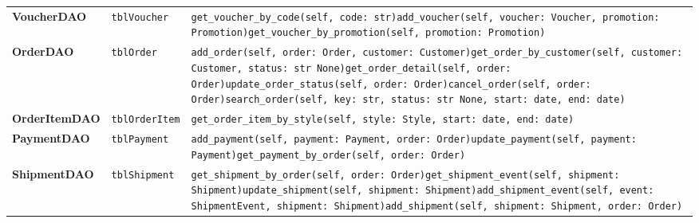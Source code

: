 {\begin{xltabular}{\textwidth}{@{}L{3.5cm} L{3.4cm} Y@{}}
\textbf{VoucherDAO} & \texttt{tblVoucher} & \texttt{get\_\allowbreak{}voucher\_\allowbreak{}by\_\allowbreak{}code(self,\allowbreak{} code: str)}\newline \texttt{add\_\allowbreak{}voucher(self,\allowbreak{} voucher: Voucher,\allowbreak{} promotion: Promotion)}\newline \texttt{get\_\allowbreak{}voucher\_\allowbreak{}by\_\allowbreak{}promotion(self,\allowbreak{} promotion: Promotion)} \\
\textbf{OrderDAO} & \texttt{tblOrder} & \texttt{add\_\allowbreak{}order(self,\allowbreak{} order: Order,\allowbreak{} customer: Customer)}\newline \texttt{get\_\allowbreak{}order\_\allowbreak{}by\_\allowbreak{}customer(self,\allowbreak{} customer: Customer,\allowbreak{} status: str \textbar{} None)}\newline \texttt{get\_\allowbreak{}order\_\allowbreak{}detail(self,\allowbreak{} order: Order)}\newline \texttt{update\_\allowbreak{}order\_\allowbreak{}status(self,\allowbreak{} order: Order)}\newline \texttt{cancel\_\allowbreak{}order(self,\allowbreak{} order: Order)}\newline \texttt{search\_\allowbreak{}order(self,\allowbreak{} key: str,\allowbreak{} status: str \textbar{} None,\allowbreak{} start: date,\allowbreak{} end: date)} \\
\textbf{OrderItemDAO} & \texttt{tblOrderItem} & \texttt{get\_\allowbreak{}order\_\allowbreak{}item\_\allowbreak{}by\_\allowbreak{}style(self,\allowbreak{} style: Style,\allowbreak{} start: date,\allowbreak{} end: date)} \\
\textbf{PaymentDAO} & \texttt{tblPayment} & \texttt{add\_\allowbreak{}payment(self,\allowbreak{} payment: Payment,\allowbreak{} order: Order)}\newline \texttt{update\_\allowbreak{}payment(self,\allowbreak{} payment: Payment)}\newline \texttt{get\_\allowbreak{}payment\_\allowbreak{}by\_\allowbreak{}order(self,\allowbreak{} order: Order)} \\
\textbf{ShipmentDAO} & \texttt{tblShipment} & \texttt{get\_\allowbreak{}shipment\_\allowbreak{}by\_\allowbreak{}order(self,\allowbreak{} order: Order)}\newline \texttt{get\_\allowbreak{}shipment\_\allowbreak{}event(self,\allowbreak{} shipment: Shipment)}\newline \texttt{update\_\allowbreak{}shipment(self,\allowbreak{} shipment: Shipment)}\newline \texttt{add\_\allowbreak{}shipment\_\allowbreak{}event(self,\allowbreak{} event: ShipmentEvent,\allowbreak{} shipment: Shipment)}\newline \texttt{add\_\allowbreak{}shipment(self,\allowbreak{} shipment: Shipment,\allowbreak{} order: Order)} \\

\end{xltabular}}
